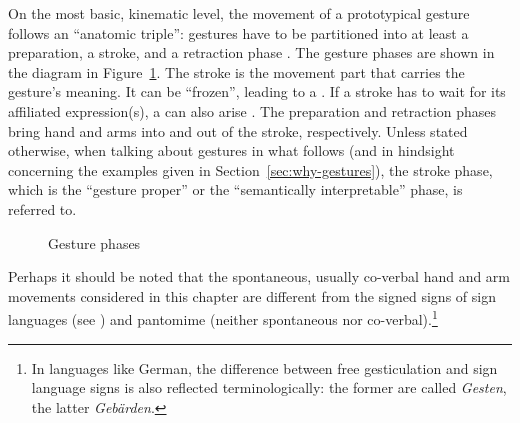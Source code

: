 \documentclass[output=paper
                ,modfonts
                ,nonflat
	        ,collection
	        ,collectionchapter
	        ,collectiontoclongg
 	        ,biblatex
                ,babelshorthands
                ,newtxmath
                ,draftmode
                ,colorlinks, citecolor=brown
]{./langsci/langscibook}
\begin{document}
On the most basic, kinematic level, the movement of a prototypical gesture follows an \enquote{anatomic triple}: gestures have to be partitioned into at least a preparation,  a stroke, and a retraction  phase \citep{Kendon:1972}.
%
The gesture phases are shown in the diagram in Figure~\ref{fig:gesture-phases}.
%
The stroke is the movement part that carries the gesture's meaning. 
%
It can be \enquote{frozen}, leading to a . 
%
If a stroke has to wait for its affiliated expression(s), a  can also arise \citep{Kita:vanGijn:vanDerHulst:1999}.
%
The preparation and retraction phases bring hand and arms into and out of the stroke, respectively. 
%
Unless stated otherwise, when talking about gestures in what follows (and in hindsight concerning the examples given in Section~\ref{sec:why-gestures}), the stroke phase, which is the \enquote{gesture proper} or the \enquote{semantically interpretable} phase, is referred to.

\begin{figure}[tb]
  \centering
  \caption{Gesture phases}
  \label{fig:gesture-phases}
\end{figure}


Perhaps it should be noted that the spontaneous, usually co-verbal hand and arm movements considered in this chapter are different from the signed signs of sign languages  (see ) and pantomime  (neither spontaneous nor co-verbal).\footnote{In languages like German, the difference between free gesticulation and sign language signs is also reflected terminologically: the former are called \textit{Gesten}, the latter \textit{Gebärden}.}
\end{document}
